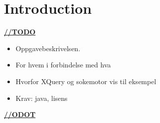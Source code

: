 \chapter{Introduction}
\underline{\textbf{\LARGE //TODO}}


\begin{itemize}
\item Oppgavebeskrivelsen.
\item For hvem i forbindelse med hva
\item Hvorfor XQuery og sokemotor vis til eksempel
\item Krav: java, lisens
\end{itemize}

\underline{\textbf{\LARGE //ODOT}}